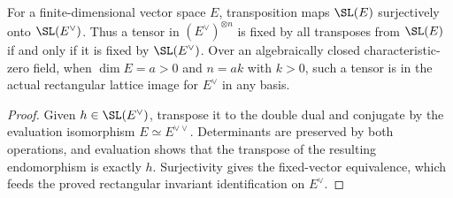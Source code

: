 \begin{lemma}
\label{lem:dual-special-linear-rectangular}
\leanok
For a finite-dimensional vector space $E$, transposition maps $\SL(E)$
surjectively onto $\SL(E^\vee)$. Thus a tensor in $(E^\vee)^{\otimes n}$
is fixed by all transposes from $\SL(E)$ if and only if it is fixed by
$\SL(E^\vee)$. Over an algebraically closed characteristic-zero field,
when $\dim E=a>0$ and $n=ak$ with $k>0$, such a tensor is in the actual
rectangular lattice image for $E^\vee$ in any basis.
\end{lemma}
\begin{proof}
Given $h\in\SL(E^\vee)$, transpose it to the double dual and conjugate
by the evaluation isomorphism $E\simeq E^{\vee\vee}$. Determinants are
preserved by both operations, and evaluation shows that the transpose
of the resulting endomorphism is exactly $h$. Surjectivity gives the
fixed-vector equivalence, which feeds the proved rectangular invariant
identification on $E^\vee$.
\end{proof}

